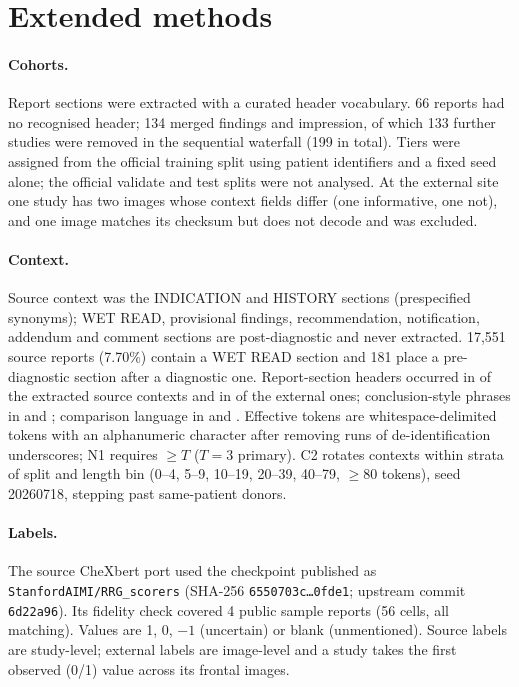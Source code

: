 \documentclass[10pt,a4paper]{article}
\begin{document}
\section{Extended methods}\label{ssec:methods}

\paragraph{Cohorts.}
Report sections were extracted with a curated header vocabulary. 66 reports had
no recognised header; 134 merged findings and impression, of which 133 further
studies were removed in the sequential waterfall (199 in total). Tiers were
assigned from the official training split using patient identifiers and a fixed
seed alone; the official validate and test splits were not analysed. At the
external site one study has two images whose context fields differ (one
informative, one not), and one image matches its checksum but does not decode
and was excluded.

\paragraph{Context.}
Source context was the INDICATION and HISTORY sections (prespecified synonyms);
WET READ, provisional findings, recommendation, notification, addendum and
comment sections are post-diagnostic and never extracted. 17,551 source reports
(7.70\%) contain a WET READ section and 181 place a pre-diagnostic section after
a diagnostic one. Report-section headers occurred in \ScanHeaderSrc{} of the
extracted source contexts and in \ScanHeaderExt{} of the external ones;
conclusion-style phrases in \ScanConclSrc{} and \ScanConclExt{}; comparison
language in \ScanComparSrc{} and \ScanComparExt{}. Effective tokens are
whitespace-delimited tokens with an alphanumeric character after removing runs
of de-identification underscores; N1 requires $\ge T$ ($T=3$ primary). C2
rotates contexts within strata of split and length bin (0--4, 5--9, 10--19,
20--39, 40--79, $\ge$80 tokens), seed 20260718, stepping past same-patient
donors.

\paragraph{Labels.}
The source CheXbert port used the checkpoint published as
\texttt{StanfordAIMI/RRG\_scorers} (SHA-256 \texttt{6550703c\ldots0fde1};
upstream commit \texttt{6d22a96}). Its fidelity check covered 4 public sample reports (56 cells, all matching).
Values are 1, 0, $-1$ (uncertain) or blank (unmentioned). Source labels are
study-level; external labels are image-level and a study takes the first
observed (0/1) value across its frontal images.
\end{document}
